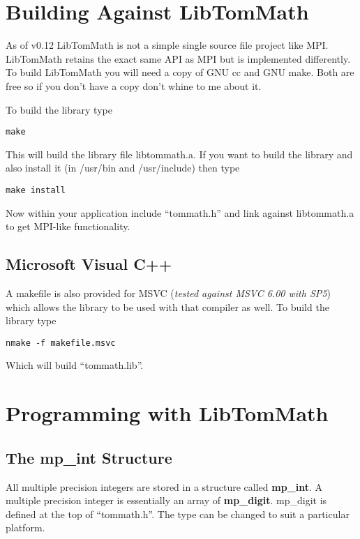 \documentclass[]{article}
\begin{document}
\section{Building Against LibTomMath}

As of v0.12 LibTomMath is not a simple single source file project like MPI.  LibTomMath retains the exact same API as MPI
but is implemented differently.  To build LibTomMath you will need a copy of GNU cc and GNU make.  Both are free so if you 
don't have a copy don't whine to me about it.

To build the library type 

\begin{verbatim}
make
\end{verbatim}

This will build the library file libtommath.a.  If you want to build the library and also install it (in /usr/bin and /usr/include) then
type 

\begin{verbatim}
make install
\end{verbatim}

Now within your application include ``tommath.h'' and link against libtommath.a to get MPI-like functionality.

\subsection{Microsoft Visual C++}
A makefile is also provided for MSVC (\textit{tested against MSVC 6.00 with SP5}) which allows the library to be used
with that compiler as well.  To build the library type

\begin{verbatim}
nmake -f makefile.msvc
\end{verbatim}

Which will build ``tommath.lib''.  

\section{Programming with LibTomMath}

\subsection{The mp\_int Structure}
All multiple precision integers are stored in a structure called \textbf{mp\_int}.  A multiple precision integer is
essentially an array of \textbf{mp\_digit}.  mp\_digit is defined at the top of ``tommath.h''.  The type can be changed 
to suit a particular platform.  
\end{document}
